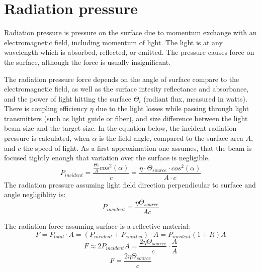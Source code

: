 \documentclass[\main/master.tex]{subfiles}
\begin{document}
\section{Radiation pressure}
Radiation pressure is pressure on the surface due to momentum exchange with an electromagnetic field, including momentum of light. The light is at any wavelength which is absorbed, reflected, or emitted. The pressure causes force on the surface, although the force is usually insignificant.
  
\par\noindent
The radiation pressure force depends on the angle of surface compare to the electromagnetic field, as well as the surface intesity reflectance and absorbance, and the power of light hitting the surface $\Theta_i$ (radiant flux, measured in watts). There is coupling efficiency $\eta$ due to the light losses while passing through light transmitters (such as light guide or fiber), and size difference between the light beam size and the target size. In the equation below, the incident radiation pressure is calculated, when $\alpha$ is the field angle, compared to the surface area $A$, and $c$ the speed of light. As a first approximation one assumes, that the beam is focused tightly enough that variation over the surface is negligible. 
\begin{equation}
P_{incident} = \frac{\frac{\Theta_i}{A}cos^2(\alpha)}{c} = \frac{\eta\cdot \Theta_{source}\cdot cos^2(\alpha)}{{A\cdot c}} \label{eqn:radiation_pressure}
\end{equation}
The radiation pressure assuming light field direction perpendicular to surface and angle negligiblity is: 
\begin{equation}
P_{incident} = \frac{\eta\Theta_{source}}{{Ac}} \label{eqn:radiation_pressure_perpendicular}
\end{equation}

The radiation force assuming surface is a reflective material:
\begin{equation}
F = P_{total}\cdot A = (P_{incident}+P_{emitted})\cdot A = P_{incident}(1+R)A \label{eqn:radiation_force}
\end{equation}
\begin{equation}
F \approx 2P_{incident}A = \frac{2\eta\Theta_{source}}{{c}}\cdot \frac{A}{A} \label{eqn:radiation_force_reflective}
\end{equation}
\begin{equation}
F = \frac{2\eta\Theta_{source}}{{c}} \label{eqn:radiation_force_power}
\end{equation}
\end{document}
